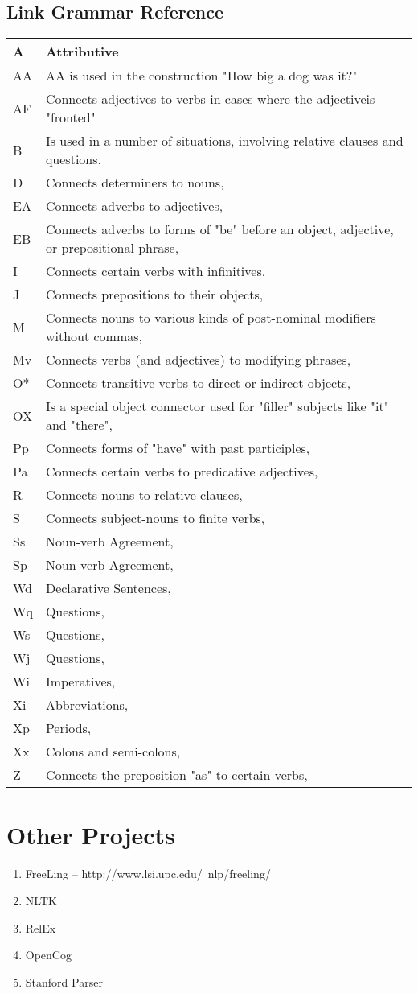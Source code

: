\documentclass[a4paper,10pt]{report}
\begin{document}
\subsection{Link Grammar Reference}
\begin{tabular}{ | l | l | }
	\hline
    A  & Attributive\\ \hline
    AA & AA is used in the construction "How big a dog was it?"\\ \hline
    AF & Connects adjectives to verbs in cases where the adjectiveis "fronted"\\ \hline
    B  & Is used in a number of situations, involving relative clauses and questions.\\ \hline
    D  & Connects determiners to nouns,\\ \hline
    EA & Connects adverbs to adjectives,\\ \hline
    EB & Connects adverbs to forms of "be" before an object, adjective, or prepositional phrase,\\ \hline
    I  & Connects certain verbs with infinitives,\\ \hline
    J  & Connects prepositions to their objects,\\ \hline
    M  & Connects nouns to various kinds of post-nominal modifiers without commas,\\ \hline
    Mv & Connects verbs (and adjectives) to modifying phrases,\\ \hline
    O* & Connects transitive verbs to direct or indirect objects,\\ \hline
    OX & Is a special object connector used for "filler" subjects like "it" and "there",\\ \hline
    Pp & Connects forms of "have" with past participles,\\ \hline
    Pa & Connects certain verbs to predicative adjectives,\\ \hline
    R  & Connects nouns to relative clauses,\\ \hline
    S  & Connects subject-nouns to finite verbs,\\ \hline
    Ss & Noun-verb Agreement,\\ \hline
    Sp & Noun-verb Agreement,\\ \hline
    Wd & Declarative Sentences,\\ \hline
    Wq & Questions,\\ \hline
    Ws & Questions,\\ \hline
    Wj & Questions,\\ \hline
    Wi & Imperatives,\\ \hline
    Xi & Abbreviations,\\ \hline
    Xp & Periods,\\ \hline
    Xx & Colons and semi-colons,\\ \hline
    Z  & Connects the preposition "as" to certain verbs,\\ \hline
\end{tabular}
\section{Other Projects}
\begin{enumerate}
 \item FreeLing -- http://www.lsi.upc.edu/~nlp/freeling/
 \item NLTK
 \item RelEx
 \item OpenCog
 \item Stanford Parser
\end{enumerate}
\end{document}
